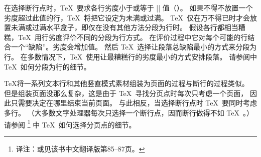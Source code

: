 \olist
\li 在选择断行点时，\TeX\ 要求各行劣度小于或等于 |\tolerance| 值（\xref \tolerance ）。
如果不得不放置一个劣度超过此值的行，\TeX\ 将把它设定为未满或过满。
\TeX\ 仅在万不得已时才会放置未满或过满水平盒子，即仅在没有其他方法分段为行时。
\li 假设各行都相当糟糕，\TeX\ 用行劣度评价不同的分段为行方式。
在评价过程中它对每个可能的行结合一个``缺陷''。劣度会增加值。
然后 \TeX\ 选择让段落总缺陷最小的方式来分段为行。
在多数情况下，\TeX\ 使用让最糟糕行的劣度最小的方式安排段落。
请参阅中 \TeX\ 如何分段为行的细节。
\endolist

\TeX 将一系列文本行和其他竖直模式素材组装为页面的过程与断行的过程类似。
但是组装页面没那么复杂，这是由于 \TeX\ 寻找分页点时每次只考虑一个页面，
因此只需要决定在哪里结束当前页面。
与此相反，当选择断行点时 \TeX\ 要同时考虑多行。%
（大多数文字处理器每次只选择一个断行点，因而断行做得不如 \TeX\ 。）%
请参阅
\footnote{译注：或见该书中文翻译版第85--87页。}
中 \TeX\ 如何选择分页点的细节。
\endconcept


